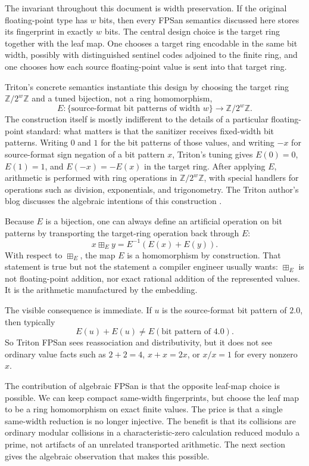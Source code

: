 \documentclass[11pt]{article}
\newcommand{\Z}{\mathbb{Z}}
\theoremstyle{plain}
\begin{document}
The invariant throughout this document is width preservation.  If the original
floating-point type has \(w\) bits, then every FPSan semantics discussed here
stores its fingerprint in exactly \(w\) bits.  The central design choice is the
target ring together with the leaf map.  One chooses a target ring encodable in
the same bit width, possibly with distinguished sentinel codes adjoined to the
finite ring, and one chooses how each source floating-point value is sent into
that target ring.

Triton's concrete semantics instantiate this design by choosing the target ring
\(\Z/2^w\Z\) and a tuned bijection, not a ring homomorphism,
\[
  E:\{\text{source-format bit patterns of width }w\}\longrightarrow \Z/2^w\Z.
\]
The construction itself is mostly indifferent to the
details of a particular floating-point standard: what matters is that the
sanitizer receives fixed-width bit patterns.  Writing \(0\) and \(1\) for the
bit patterns of those values, and writing \(-x\) for source-format sign
negation of a bit pattern \(x\), Triton's tuning gives \(E(0)=0\), \(E(1)=1\),
and \(E(-x)=-E(x)\) in the target ring.  After applying \(E\), arithmetic is
performed with ring operations in \(\Z/2^w\Z\), with special handlers for
operations such as division, exponentials, and trigonometry.  The Triton
author's blog discusses the algebraic intentions of this construction
\cite{goucher-fpsan-blog}.

Because \(E\) is a bijection, one can always define an artificial operation on
bit patterns by transporting the target-ring operation back through \(E\):
\[
  x \boxplus_E y = E^{-1}(E(x)+E(y)).
\]
With respect to \(\boxplus_E\), the map \(E\) is a homomorphism by construction.
That statement is true but not the statement a compiler engineer usually wants:
\(\boxplus_E\) is not floating-point addition, nor exact rational addition of
the represented values.  It is the arithmetic manufactured by the embedding.

The visible consequence is immediate.  If \(u\) is the source-format bit pattern
of \(2.0\), then typically
\[
  E(u) + E(u) \ne E(\text{bit pattern of }4.0).
\]
So Triton FPSan sees reassociation and distributivity, but it does not see
ordinary value facts such as \(2+2=4\), \(x+x=2x\), or \(x/x=1\) for every
nonzero \(x\).

The contribution of algebraic FPSan is that the opposite leaf-map choice is
possible.  We can keep compact same-width fingerprints, but choose the leaf map
to be a ring homomorphism on exact finite values.  The price is that a single
same-width reduction is no longer injective.  The benefit is that its collisions
are ordinary modular collisions in a characteristic-zero calculation reduced
modulo a prime, not artifacts of an unrelated transported arithmetic.  The next
section gives the algebraic observation that makes this possible.
\end{document}
